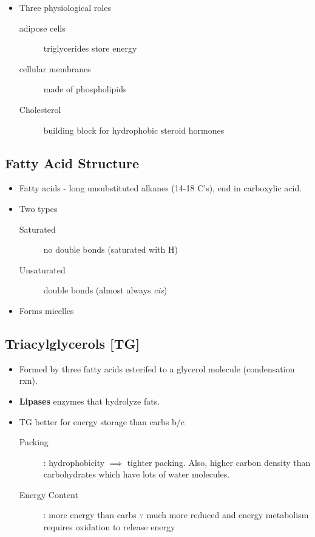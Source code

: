 \documentclass[10pt,a4paper]{report}
\begin{document}
	\begin{itemize}
		\item Three physiological roles
		\begin{description}	
			\item[adipose cells] triglycerides store energy
			\item [cellular membranes] made of phospholipids
			\item[Cholesterol] building block for hydrophobic steroid hormones
		\end{description}
	\end{itemize}
	
	\subsection{Fatty Acid Structure}
	
	\begin{itemize}
		\item Fatty acids - long unsubstituted alkanes (14-18 C's), end in carboxylic acid.
		\item Two types
		\begin{description}
			\item[Saturated] no double bonds (saturated with H)
			\item[Unsaturated] double bonds (almost always \emph{cis})
		\end{description}
		\item Forms micelles
	\end{itemize}
	
	\subsection{Triacylglycerols [TG]}
	
	\begin{itemize}
		\item Formed by three fatty acids esterifed to a glycerol molecule (condensation rxn).
		\item \textbf{Lipases} enzymes that hydrolyze fats.
		\item TG better for energy storage than carbs b/c
		\begin{description}
			\item[Packing]: hydrophobicity $\implies$ tighter packing. Also, higher carbon density than carbohydrates which have lots of water molecules.
			\item[Energy Content]: more energy than carbs $\because$ much more reduced and energy metabolism requires oxidation to release energy
		\end{description}
	\end{itemize}
	
\end{document}
